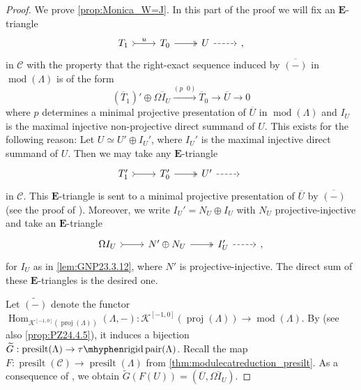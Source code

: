 \documentclass[10pt,twoside, a4paper,reqno]{amsart}
\DeclareMathOperator{\mods}{mod}
\newcommand{\taurigidpair}{\mathrm{\tau\mhyphen rigid{\,}pair}}
\DeclareMathOperator{\presilt}{presilt}
\DeclareMathOperator{\Hom}{Hom}
\DeclareMathOperator{\proj}{proj}
\newcommand{\Ktwo}{\mathcal{K}^{[-1,0]}}
\newcommand{\calC}{\mathcal{C}}
\newcommand{\E}{\mathbf{E}}
\theoremstyle{definition}
\begin{document}
\begin{proof}
   We prove \eqref{prop:Monica_W=J}. In this part of the proof we will fix an $\E$-triangle
   \begin{equation}\label{eq:confU}
        \begin{tikzcd}
            T_1 \arrow[r, tail, "{u}"] & T_0 \arrow[r,two heads] & U \arrow[r, dashed] & {},
        \end{tikzcd}
\end{equation}
in $\calC$ with the property that the right-exact sequence induced by $\overline{(-)}$ in $\mods (\Lambda)$ is of the form
\[ (\overline{T}_1)' \oplus \overline{\Omega I_U} \xrightarrow{(p \phantom{x} 0)} \overline{T}_0 \to \overline{U} \to 0\]
    where $p$ determines a minimal projective presentation of $\overline{U}$ in $\mods(\Lambda)$ and $I_U$ is the maximal injective non-projective direct summand of $U$. This exists for the following reason: Let $U \simeq U' \oplus I_U'$, where $I_U'$ is the maximal injective direct summand of $U$. Then we may take any $\E$-triangle 
   \begin{equation*}
        \begin{tikzcd}
            T_1'\arrow[r, tail] & T_0' \arrow[r,two heads] & U' \arrow[r, dashed] & {}
        \end{tikzcd}
\end{equation*}
in $\calC$. This $\E$-triangle is sent to a minimal projective presentation of $\overline{U}$ by $\overline{(-)}$ (see the proof of \cite[Prop. 4.5]{PZ24}). Moreover, we write $I_U' = N_U  \oplus I_U$ with $N_U$ projective-injective and take an $\E$-triangle 
\begin{equation*}
        \begin{tikzcd}
            \Omega I_U \arrow[r, tail] & N' \oplus N_U \arrow[r,two heads] & I_U' \arrow[r, dashed] & {},
        \end{tikzcd}
\end{equation*}
for $I_U$ as in \cref{lem:GNP23.3.12}, where $N'$ is projective-injective. The direct sum of these $\E$-triangles is the desired one. 

Let $\widetilde{(-)}$ denote the functor $\Hom_{\Ktwo(\proj(\Lambda))}(\Lambda,-) \colon \Ktwo(\proj (\Lambda)) \to \mods(\Lambda)$. By \cite[Thm. 3.2]{AIR2014} (see also \eqref{prop:PZ24.4.5}), it induces a bijection $\widetilde{G}: \presilt (\Lambda) \to \taurigidpair(\Lambda)$. 
Recall the map $F: \presilt(\calC) \to \presilt (\Lambda)$ from \eqref{thm:modulecatreduction_presilt}. As a consequence of \cite[Thm. 3.2]{AIR2014}, we obtain $\widetilde{G}(F(U)) = (\overline{U}, \overline{\Omega I_U})$. 


\end{proof}
\end{document}
